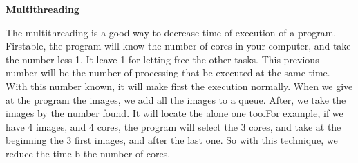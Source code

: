 \textbf{Multithreading}

The multithreading is a good way to decrease time of execution of a program. Firstable, the program will know the number of cores in your computer, and take the number less 1. It leave 1 for letting free the other tasks.
This previous number will be the number of processing that be executed at the same time. With this number known, it will make first the execution normally. When we give at the program the images, we add all the images to a queue. After, we take the images by the number found. It will locate the alone one too.For example, if we have 4 images, and 4 cores, the program will select the 3 cores, and take at the beginning the 3 first images, and after the last one.
So with this technique, we reduce the time b the number of cores.


  
  